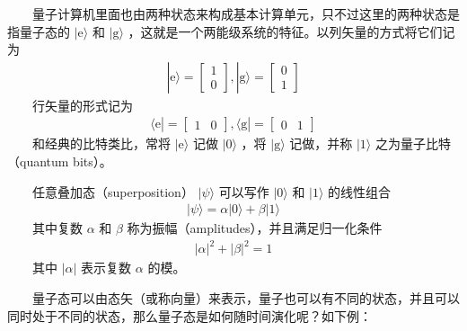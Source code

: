 \documentclass[a4paper,11pt,english]{sphinxmanual}
\begin{document}
\sphinxAtStartPar
  量子计算机里面也由两种状态来构成基本计算单元，只不过这里的两种状态是指量子态的 \(|\mathrm{e}\rangle\) 和  \(|\mathrm{g}\rangle\) ，这就是一个两能级系统的特征。以列矢量的方式将它们记为
\begin{equation*}
\begin{split}|\mathrm{e}\rangle=\left[\begin{array}{l} 1 \\ 0 \end{array}\right],|\mathrm{g}\rangle=\left[\begin{array}{l} 0 \\ 1 \end{array}\right]\end{split}
\end{equation*}
\sphinxAtStartPar
  行矢量的形式记为
\begin{equation*}
\begin{split}\langle\mathrm{e}|=\left[\begin{array}{ll} 1 & 0 \end{array}\right],\langle\mathrm{g}|=\left[\begin{array}{ll} 0 & 1 \end{array}\right]\end{split}
\end{equation*}
\sphinxAtStartPar
  和经典的比特类比，常将 \(|\mathrm{e}\rangle\) 记做 \(|0\rangle\) ，将 \(|\mathrm{g}\rangle\) 记做，并称 \(|\mathrm{1}\rangle\) 之为量子比特（quantum bits）。

\sphinxAtStartPar
  任意叠加态（superposition）  \(|\psi\rangle\) 可以写作 \(|\mathrm{0}\rangle\) 和 \(|\mathrm{1}\rangle\) 的线性组合
\begin{equation*}
\begin{split}|\psi\rangle=\alpha|0\rangle+\beta|1\rangle\end{split}
\end{equation*}
\sphinxAtStartPar
  其中复数 \(\alpha\) 和  \(\beta\) 称为振幅（amplitudes），并且满足归一化条件
\begin{equation*}
\begin{split}|\alpha|^{2}+|\beta|^{2}=1\end{split}
\end{equation*}
\sphinxAtStartPar
  其中 \(|\alpha|\) 表示复数 \(\alpha\) 的模。

\sphinxAtStartPar
{}

\sphinxAtStartPar
  量子态可以由态矢（或称向量）来表示，量子也可以有不同的状态，并且可以同时处于不同的状态，那么量子态是如何随时间演化呢？如下例：
\end{document}

